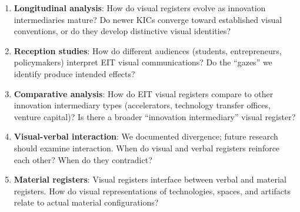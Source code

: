 \documentclass[../main.tex]{subfiles}
\begin{document}
\begin{enumerate}
    \item \textbf{Longitudinal analysis}: How do visual registers evolve as innovation intermediaries mature? Do newer KICs converge toward established visual conventions, or do they develop distinctive visual identities?

    \item \textbf{Reception studies}: How do different audiences (students, entrepreneurs, policymakers) interpret EIT visual communications? Do the ``gazes'' we identify produce intended effects?

    \item \textbf{Comparative analysis}: How do EIT visual registers compare to other innovation intermediary types (accelerators, technology transfer offices, venture capital)? Is there a broader ``innovation intermediary'' visual register?

    \item \textbf{Visual-verbal interaction}: We documented divergence; future research should examine interaction. When do visual and verbal registers reinforce each other? When do they contradict?

    \item \textbf{Material registers}: Visual registers interface between verbal and material registers. How do visual representations of technologies, spaces, and artifacts relate to actual material configurations?
\end{enumerate}
\end{document}
